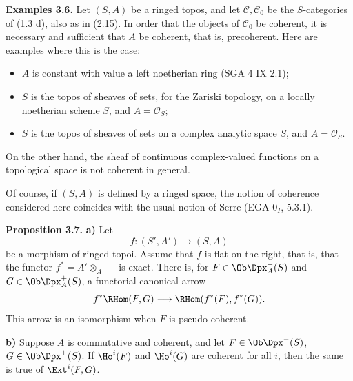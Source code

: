 \textbf{Examples 3.6.} Let \((S,A)\) be a ringed topos, and let \(\mathcal C,\mathcal C_0\) be the \(S\)-categories of (\hyperlink{sga6.e01.sec.1.3}{1.3} d), also as in \hyperlink{sga6.e01.ex.2-15}{(2.15)}. In order that the objects of \(\mathcal C_0\) be coherent, it is necessary and sufficient that \(A\) be coherent, that is, precoherent. Here are examples where this is the case:
\begin{itemize}
\item \(A\) is constant with value a left noetherian ring (SGA 4 IX 2.1);
\item \(S\) is the topos of sheaves of sets, for the Zariski topology, on a locally noetherian scheme \(S\), and \(A=\mathcal O_S\);
\item \(S\) is the topos of sheaves of sets on a complex analytic space \(S\), and \(A=\mathcal O_S\).
\end{itemize}
On the other hand, the sheaf of continuous complex-valued functions on a topological space is not coherent in general.

Of course, if \((S,A)\) is defined by a ringed space, the notion of coherence considered here coincides with the usual notion of Serre (EGA \(0_I\), 5.3.1).

\textbf{Proposition 3.7.} \textbf{a)} Let
\[
  f:(S',A')\longrightarrow(S,A)
\]
be a morphism of ringed topoi. Assume that \(f\) is flat on the right, that is, that the functor \(f^*=A'\otimes_A-\) is exact. There is, for \(F\in\Ob\Dpx_A^-(S)\) and \(G\in\Ob\Dpx_A^+(S)\), a functorial canonical arrow
\[
  f^*\RHom(F,G)\longrightarrow \RHom(f^*(F),f^*(G)).
\]
This arrow is an isomorphism when \(F\) is pseudo-coherent.

\textbf{b)} Suppose \(A\) is commutative and coherent, and let \(F\in\Ob\Dpx^-(S)\), \(G\in\Ob\Dpx^+(S)\). If \(\Ho^i(F)\) and \(\Ho^i(G)\) are coherent for all \(i\), then the same is true of \(\Ext^i(F,G)\).


